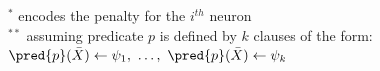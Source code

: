 \begin{table}
{\begin{tabular}{l|r||cl|r}
    \end{tabular}
    \begin{center}\scriptsize
        $^{*}$ encodes the penalty for the $i^{th}$ neuron
        \\
        \smallskip
        $^{**}$ assuming predicate $p$ is defined by $k$ clauses of the form:
        \\
        $\pred{p}(\bar{X}) \leftarrow \psi_1,\ \ldots,\ \pred{p}(\bar{X}) \leftarrow \psi_k$
    \end{center}
    \label{tab:kill-logic-formulae}
    }
\end{table}
